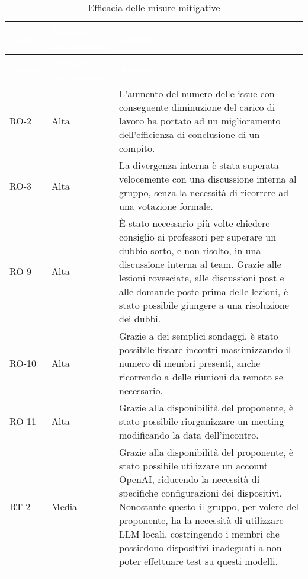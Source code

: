 {
\setlength{\tabcolsep}{10pt}
\renewcommand{\arraystretch}{1.5}
\begin{xltabular}{\textwidth}{| l | l | X |}
    \hline
     \textbf{\textcolor{white}{Codice}} & \textbf{\textcolor{white}{Efficacia mitigazione}} & \textbf{\textcolor{white}{Analisi}} \\
    \hline
    \endfirsthead
    \hline
     \textbf{\textcolor{white}{Codice}} & \textbf{\textcolor{white}{Efficacia mitigazione}} & \textbf{\textcolor{white}{Analisi}} \\
    \hline
    \endhead
    RO-2 & Alta & L'aumento del numero delle issue con conseguente diminuzione del carico di lavoro ha portato ad un miglioramento dell'efficienza di conclusione di un compito. \\
    \hline
    RO-3 & Alta & La divergenza interna è stata superata velocemente con una discussione interna al gruppo, senza la necessità di ricorrere ad una votazione formale. \\
    \hline
    RO-9 & Alta & È stato necessario più volte chiedere consiglio ai professori per superare un dubbio sorto, e non risolto, in una discussione interna al team. Grazie alle lezioni rovesciate, alle discussioni post  e alle domande poste prima delle lezioni, è stato possibile giungere a una risoluzione dei dubbi. \\
    \hline
    RO-10 & Alta & Grazie a dei semplici sondaggi, è stato possibile fissare incontri massimizzando il numero di membri presenti, anche ricorrendo a delle riunioni da remoto se necessario. \\
    \hline
    RO-11 & Alta & Grazie alla disponibilità del proponente, è stato possibile riorganizzare un meeting modificando la data dell'incontro. \\
    \hline
    RT-2 & Media & Grazie alla disponibilità del proponente, è stato possibile utilizzare un account OpenAI, riducendo la necessità di specifiche configurazioni dei dispositivi. Nonostante questo il gruppo, per volere del proponente, ha la necessità di utilizzare LLM locali, costringendo i membri che possiedono dispositivi inadeguati a non poter effettuare test su questi modelli.\\
    \hline
     \caption{Efficacia delle misure mitigative}
    \label{tab:mitigazioni}
\end{xltabular}
}


\newpage